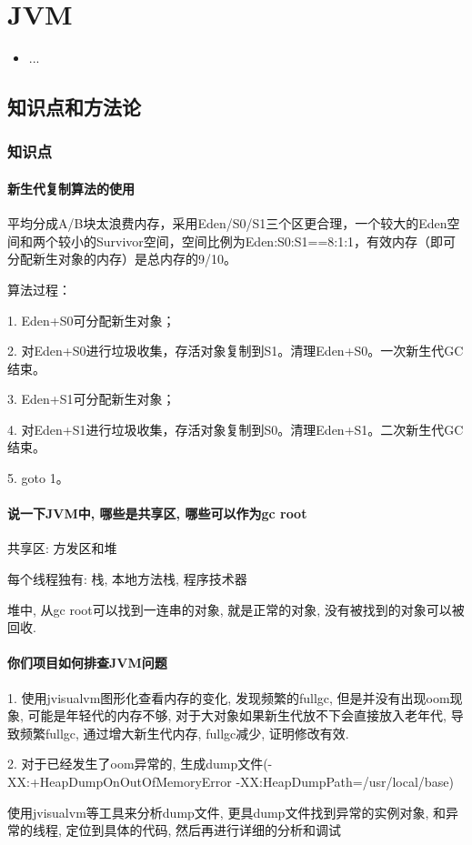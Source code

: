 \chapter{JVM}
\label{chap1}
\begin{itemize}[noitemsep,topsep=0pt,parsep=0pt,partopsep=0pt]
	\item ...
\end{itemize}

\section{知识点和方法论}

\subsection{知识点}
\subsubsection{新生代复制算法的使用}
平均分成A/B块太浪费内存，采用Eden/S0/S1三个区更合理，一个较大的Eden空间和两个较小的Survivor空间，空间比例为Eden:S0:S1==8:1:1，有效内存（即可分配新生对象的内存）是总内存的9/10。

算法过程：

1. Eden+S0可分配新生对象；

2. 对Eden+S0进行垃圾收集，存活对象复制到S1。清理Eden+S0。一次新生代GC结束。

3. Eden+S1可分配新生对象；

4. 对Eden+S1进行垃圾收集，存活对象复制到S0。清理Eden+S1。二次新生代GC结束。

5. goto 1。
\subsubsection{说一下JVM中, 哪些是共享区, 哪些可以作为gc root}
共享区: 方发区和堆 \par
每个线程独有: 栈, 本地方法栈, 程序技术器 \par
堆中, 从gc root可以找到一连串的对象, 就是正常的对象, 没有被找到的对象可以被回收.
\subsubsection{你们项目如何排查JVM问题}
1. 使用jvisualvm图形化查看内存的变化, 发现频繁的fullgc, 但是并没有出现oom现象, 可能是年轻代的内存不够, 对于大对象如果新生代放不下会直接放入老年代, 导致频繁fullgc, 通过增大新生代内存, fullgc减少, 证明修改有效. \par
2. 对于已经发生了oom异常的, 生成dump文件(-XX:+HeapDumpOnOutOfMemoryError -XX:HeapDumpPath=/usr/local/base) \par
使用jvisualvm等工具来分析dump文件, 更具dump文件找到异常的实例对象, 和异常的线程, 定位到具体的代码, 然后再进行详细的分析和调试 \par
